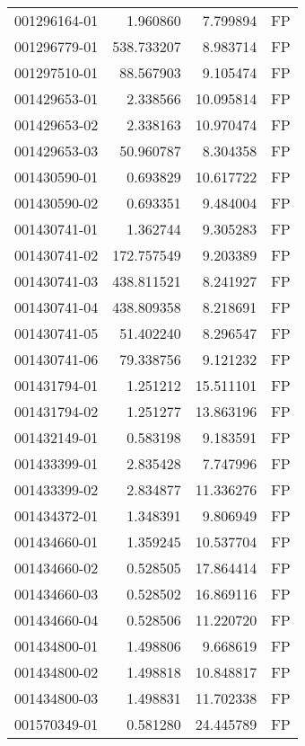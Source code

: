 \begin{tabular}{lrrl}
001296164-01 &    1.960860 &       7.799894 &   FP \\
001296779-01 &  538.733207 &       8.983714 &   FP \\
001297510-01 &   88.567903 &       9.105474 &   FP \\
001429653-01 &    2.338566 &      10.095814 &   FP \\
001429653-02 &    2.338163 &      10.970474 &   FP \\
001429653-03 &   50.960787 &       8.304358 &   FP \\
001430590-01 &    0.693829 &      10.617722 &   FP \\
001430590-02 &    0.693351 &       9.484004 &   FP \\
001430741-01 &    1.362744 &       9.305283 &   FP \\
001430741-02 &  172.757549 &       9.203389 &   FP \\
001430741-03 &  438.811521 &       8.241927 &   FP \\
001430741-04 &  438.809358 &       8.218691 &   FP \\
001430741-05 &   51.402240 &       8.296547 &   FP \\
001430741-06 &   79.338756 &       9.121232 &   FP \\
001431794-01 &    1.251212 &      15.511101 &   FP \\
001431794-02 &    1.251277 &      13.863196 &   FP \\
001432149-01 &    0.583198 &       9.183591 &   FP \\
001433399-01 &    2.835428 &       7.747996 &   FP \\
001433399-02 &    2.834877 &      11.336276 &   FP \\
001434372-01 &    1.348391 &       9.806949 &   FP \\
001434660-01 &    1.359245 &      10.537704 &   FP \\
001434660-02 &    0.528505 &      17.864414 &   FP \\
001434660-03 &    0.528502 &      16.869116 &   FP \\
001434660-04 &    0.528506 &      11.220720 &   FP \\
001434800-01 &    1.498806 &       9.668619 &   FP \\
001434800-02 &    1.498818 &      10.848817 &   FP \\
001434800-03 &    1.498831 &      11.702338 &   FP \\
001570349-01 &    0.581280 &      24.445789 &   FP \\

\end{tabular}
